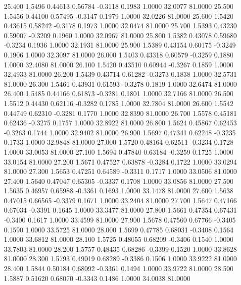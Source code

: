   25.400   1.5496   0.44613   0.56784  -0.3118   0.1983   1.0000  32.0077  81.0000
  25.500   1.5456   0.44100   0.57495  -0.3147   0.1979   1.0000  32.0226  81.0000
  25.600   1.5420   0.43615   0.58242  -0.3178   0.1973   1.0000  32.0474  81.0000
  25.700   1.5393   0.43230   0.59007  -0.3209   0.1960   1.0000  32.0967  81.0000
  25.800   1.5382   0.43078   0.59680  -0.3234   0.1936   1.0000  32.1931  81.0000
  25.900   1.5389   0.43154   0.60175  -0.3249   0.1906   1.0000  32.3097  81.0000
  26.000   1.5403   0.43318   0.60579  -0.3259   0.1880   1.0000  32.4080  81.0000
  26.100   1.5420   0.43510   0.60944  -0.3267   0.1859   1.0000  32.4933  81.0000
  26.200   1.5439   0.43714   0.61282  -0.3273   0.1838   1.0000  32.5731  81.0000
  26.300   1.5461   0.43931   0.61593  -0.3278   0.1819   1.0000  32.6474  81.0000
  26.400   1.5485   0.44166   0.61873  -0.3281   0.1801   1.0000  32.7166  81.0000
  26.500   1.5512   0.44430   0.62116  -0.3282   0.1785   1.0000  32.7804  81.0000
  26.600   1.5542   0.44749   0.62310  -0.3281   0.1770   1.0000  32.8390  81.0000
  26.700   1.5578   0.45181   0.62436  -0.3275   0.1757   1.0000  32.8922  81.0000
  26.800   1.5624   0.45867   0.62453  -0.3263   0.1744   1.0000  32.9402  81.0000
  26.900   1.5697   0.47341   0.62248  -0.3235   0.1733   1.0000  32.9848  81.0000
  27.000   1.5720   0.48164   0.62511  -0.3234   0.1728   1.0000  33.0053  81.0000
  27.100   1.5694   0.47840   0.63184  -0.3259   0.1725   1.0000  33.0154  81.0000
  27.200   1.5671   0.47527   0.63878  -0.3284   0.1722   1.0000  33.0294  81.0000
  27.300   1.5653   0.47251   0.64589  -0.3311   0.1717   1.0000  33.0506  81.0000
  27.400   1.5640   0.47047   0.65305  -0.3337   0.1708   1.0000  33.0856  81.0000
  27.500   1.5635   0.46957   0.65988  -0.3361   0.1693   1.0000  33.1478  81.0000
  27.600   1.5638   0.47015   0.66565  -0.3379   0.1671   1.0000  33.2404  81.0000
  27.700   1.5647   0.47166   0.67034  -0.3391   0.1645   1.0000  33.3477  81.0000
  27.800   1.5661   0.47354   0.67431  -0.3400   0.1617   1.0000  33.4599  81.0000
  27.900   1.5678   0.47560   0.67766  -0.3405   0.1590   1.0000  33.5725  81.0000
  28.000   1.5699   0.47785   0.68031  -0.3408   0.1564   1.0000  33.6812  81.0000
  28.100   1.5725   0.48055   0.68209  -0.3406   0.1540   1.0000  33.7803  81.0000
  28.200   1.5757   0.48435   0.68286  -0.3399   0.1520   1.0000  33.8628  81.0000
  28.300   1.5793   0.49019   0.68289  -0.3386   0.1506   1.0000  33.9222  81.0000
  28.400   1.5844   0.50184   0.68092  -0.3361   0.1494   1.0000  33.9722  81.0000
  28.500   1.5887   0.51620   0.68070  -0.3343   0.1486   1.0000  34.0038  81.0000
